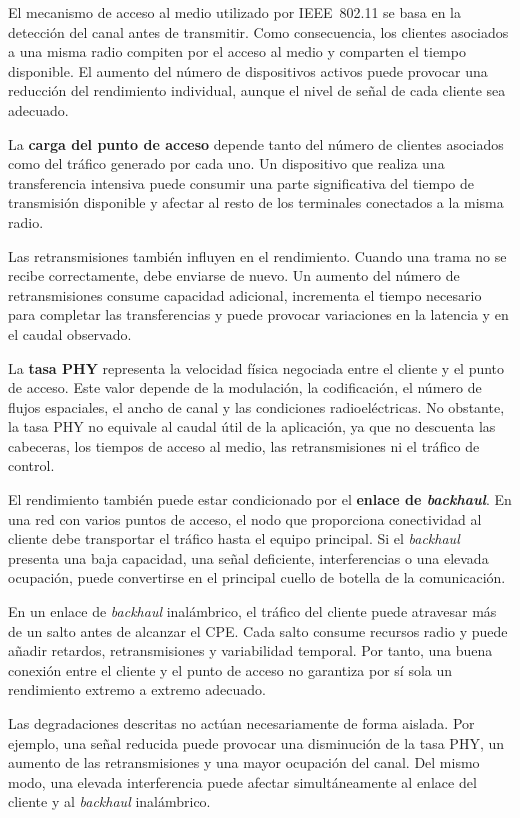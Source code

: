 El mecanismo de acceso al medio utilizado por IEEE~802.11 se basa en la
detección del canal antes de transmitir. Como consecuencia, los clientes
asociados a una misma radio compiten por el acceso al medio y comparten
el tiempo disponible. El aumento del número de dispositivos activos puede
provocar una reducción del rendimiento individual, aunque el nivel de
señal de cada cliente sea adecuado.

La \textbf{carga del punto de acceso} depende tanto del número de clientes
asociados como del tráfico generado por cada uno. Un dispositivo que
realiza una transferencia intensiva puede consumir una parte
significativa del tiempo de transmisión disponible y afectar al resto de
los terminales conectados a la misma radio.

Las retransmisiones también influyen en el rendimiento. Cuando una trama
no se recibe correctamente, debe enviarse de nuevo. Un aumento del número
de retransmisiones consume capacidad adicional, incrementa el tiempo
necesario para completar las transferencias y puede provocar variaciones
en la latencia y en el caudal observado.

La \textbf{tasa PHY} representa la velocidad física negociada entre el
cliente y el punto de acceso. Este valor depende de la modulación, la
codificación, el número de flujos espaciales, el ancho de canal y las
condiciones radioeléctricas. No obstante, la tasa PHY no equivale al
caudal útil de la aplicación, ya que no descuenta las cabeceras, los
tiempos de acceso al medio, las retransmisiones ni el tráfico de control.

El rendimiento también puede estar condicionado por el
\textbf{enlace de \textit{backhaul}}. En una red con varios puntos de
acceso, el nodo que proporciona conectividad al cliente debe transportar
el tráfico hasta el equipo principal. Si el \textit{backhaul} presenta
una baja capacidad, una señal deficiente, interferencias o una elevada
ocupación, puede convertirse en el principal cuello de botella de la
comunicación.

En un enlace de \textit{backhaul} inalámbrico, el tráfico del cliente
puede atravesar más de un salto antes de alcanzar el CPE. Cada salto
consume recursos radio y puede añadir retardos, retransmisiones y
variabilidad temporal. Por tanto, una buena conexión entre el cliente y
el punto de acceso no garantiza por sí sola un rendimiento extremo a
extremo adecuado.

Las degradaciones descritas no actúan necesariamente de forma aislada.
Por ejemplo, una señal reducida puede provocar una disminución de la tasa
PHY, un aumento de las retransmisiones y una mayor ocupación del canal.
Del mismo modo, una elevada interferencia puede afectar simultáneamente
al enlace del cliente y al \textit{backhaul} inalámbrico.


